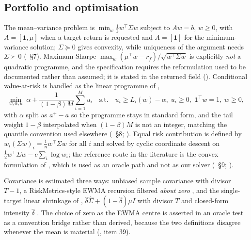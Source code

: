 \documentclass[11pt,a4paper]{article}
\begin{document}
\subsection{Portfolio and optimisation}
The mean--variance problem is $\min_w \tfrac12 w^\top \Sigma w$ subject to
$Aw = b$, $w \ge 0$, with $A = [\mathbf{1}, \mu]$ when a target return is requested and
$A = [\mathbf{1}]$ for the minimum-variance solution; $\Sigma \succeq 0$ gives convexity,
while uniqueness of the argument needs $\Sigma \succ 0$
(~\S7). Maximum Sharpe
$\max_w (\mu^\top w - r_f)/\sqrt{w^\top \Sigma w}$ is explicitly \emph{not} a quadratic
programme, and the specification requires the reformulation used to be documented rather than
assumed; it is stated in the returned  field
(). Conditional
value-at-risk is handled as the linear programme of \citet{rockafellar2000optimization},
\begin{equation}
\min_{w,\alpha,u} \; \alpha + \frac{1}{(1-\beta)M} \sum_{i=1}^{M} u_i
\quad \text{s.t.} \quad
u_i \ge L_i(w) - \alpha,\; u_i \ge 0,\; \mathbf{1}^\top w = 1,\; w \ge 0,
\end{equation}
with $\alpha$ split as $a^{+} - a$ so the programme stays in standard form, and the tail weight
$1-\beta$ interpolated when $(1-\beta)M$ is not an integer, matching the quantile convention
used elsewhere (~\S8;
). Equal risk contribution is
defined by $w_i (\Sigma w)_i = \tfrac1n w^\top \Sigma w$ for all $i$ and solved by cyclic
coordinate descent on $\tfrac12 w^\top \Sigma w - c \sum_i \log w_i$; the reference route in the
literature is the convex formulation of \citet{spinu2013efficient}, which is used as an oracle
path and not as our solver (~\S9;
).

Covariance is estimated three ways: unbiased sample covariance with divisor $T-1$, a
RiskMetrics-style EWMA recursion filtered \emph{about zero} \citep{jpmorgan1996riskmetrics},
and the single-target linear shrinkage of \citet{ledoit2004well},
$\hat\delta \hat\Sigma + (1-\hat\delta)\mu I$ with divisor $T$ and closed-form intensity
$\hat\delta$ \citep{ledoit2004well}. The choice of zero as the EWMA centre is asserted in an
oracle test as a convention bridge rather than derived, because the two definitions disagree
whenever the mean is material (, item 39).
\end{document}
